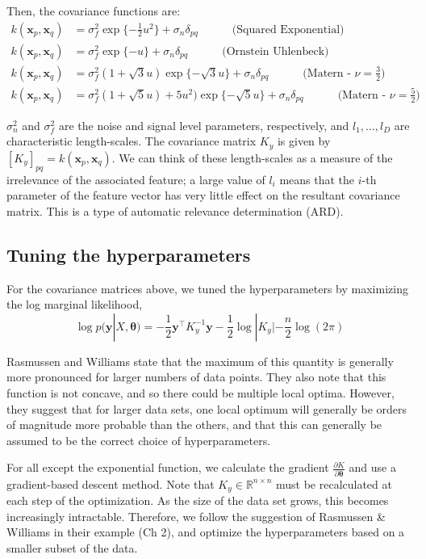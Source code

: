 \documentclass{article} %
\def\bfx{\mathbf x}
\def\bfy{\mathbf y}
\def\bftheta{\mathbf \theta}
\def\R{\mathbb R}
\begin{document}
Then, the covariance functions are:
\begin{align}
	k(\bfx_p, \bfx_q) &= \sigma_f^2 \exp\{- \frac{1}{2} u^2\} + \sigma_n \delta_{pq} \quad \quad \quad \mbox{(Squared Exponential)}   \\
	k(\bfx_p, \bfx_q) &= \sigma_f^2 \exp\{- u\} + \sigma_n \delta_{pq} \quad \quad \quad \mbox{(Ornstein Uhlenbeck)}   \\
	k(\bfx_p, \bfx_q) &= \sigma_f^2 \left( 1 + \sqrt{3} u \right) \exp\{- \sqrt{3}  u\} + \sigma_n \delta_{pq} \quad \quad \quad \mbox{(Matern - $\nu = \frac{3}{2}$)}   \\
	k(\bfx_p, \bfx_q) &= \sigma_f^2 \left( 1 + \sqrt{5} u \right) + 5 u^2) \exp\{- \sqrt{5} u\} + \sigma_n \delta_{pq} \quad \quad \quad \mbox{(Matern  - $\nu = \frac{5}{2}$)}
\end{align}

$\sigma_n^2$ and $\sigma_f^2$ are the noise and signal level parameters, respectively, and $l_1, \dots, l_D$ are characteristic length-scales.
The covariance matrix $K_y$ is given by $[K_y]_{pq} = k(\bfx_p, \bfx_q)$.
We can think of these length-scales as a measure of the irrelevance of the associated feature; a large value of $l_i$ means that the $i$-th parameter of the feature vector has very little effect on the resultant covariance matrix.
This is a type of automatic relevance determination (ARD).


\subsection{Tuning the hyperparameters}
For the covariance matrices above, we tuned the hyperparameters by maximizing the log marginal likelihood, 
\begin{equation}
	\log p(\bfy | X, \bftheta) = - \frac{1}{2} \bfy^\top K_y^{-1} \bfy - \frac{1}{2} \log | K_y | - \frac{n}{2} \log (2 \pi)
\end{equation}

Rasmussen and Williams state that the maximum of this quantity is generally more pronounced for larger numbers of data points.
They also note that this function is not concave, and so there could be multiple local optima.
However, they suggest that for larger data sets, one local optimum will generally be orders of magnitude more probable than the others, and that this can generally be assumed to be the correct choice of hyperparameters.

For all except the exponential function, we calculate the gradient $\frac{\partial K} {\partial \bftheta}$ and use a gradient-based descent method.
Note that $K_y \in \R^{n \times n}$ must be recalculated at each step of the optimization.
As the size of the data set grows, this becomes increasingly intractable.
Therefore, we follow the suggestion of Rasmussen \& Williams in their example (Ch 2), and optimize the hyperparameters based on a smaller subset of the data.
\end{document}
